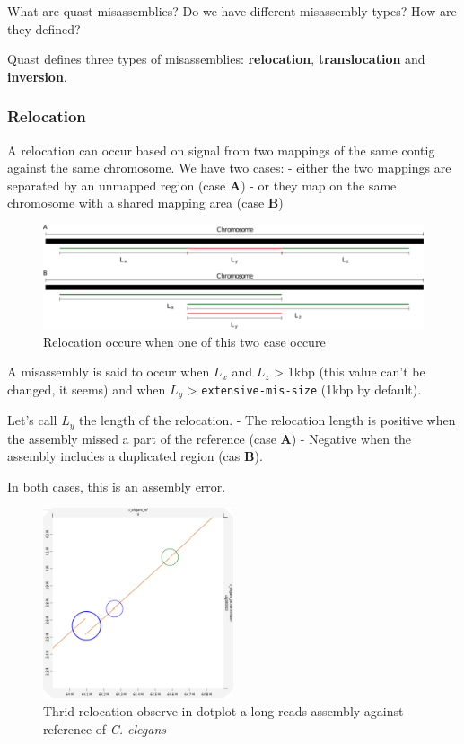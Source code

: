 \documentclass[./main.tex]{subfiles}
\begin{document}
What are quast misassemblies? Do we have different misassembly types?
How are they defined?

Quast defines three types of misassemblies: \textbf{relocation},
\textbf{translocation} and \textbf{inversion}.

\subsubsection{Relocation}\label{relocation}

A relocation can occur based on signal from two mappings of the same
contig against the same chromosome. We have two cases: - either the two
mappings are separated by an unmapped region (case \textbf{A}) - or they
map on the same chromosome with a shared mapping area (case \textbf{B})

\begin{figure}[ht]
\centering
\includegraphics[width=\textwidth]{paper/misassemblies-in-noisy-assemblies/relocation_def.pdf}
\caption{Relocation occure when one of this two case occure}
\end{figure}

A misassembly is said to occur when \(L_x\) and \(L_z\) \textgreater{}
1kbp (this value can't be changed, it seems) and when \(L_y\)
\textgreater{} \texttt{extensive-mis-size} (1kbp by default).

Let's call \(L_y\) the length of the relocation. - The relocation length
is positive when the assembly missed a part of the reference (case
\textbf{A}) - Negative when the assembly includes a duplicated region
(cas \textbf{B}).

In both cases, this is an assembly error.

\begin{figure}[ht]
\centering
\includegraphics[width=0.5\textwidth]{paper/misassemblies-in-noisy-assemblies/relocation_dotplot_exemple.pdf}
\caption{Thrid relocation observe in dotplot a long reads assembly against reference of \textit{C. elegans}}
\end{figure}
\end{document}
